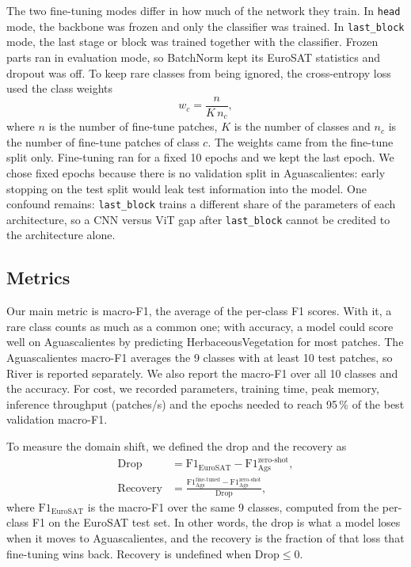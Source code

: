 The two fine-tuning modes differ in how much of the network they train. In \texttt{head} mode,
the backbone was frozen and only the classifier was trained. In \texttt{last\_block} mode, the
last stage or block was trained together with the classifier. Frozen parts ran in evaluation
mode, so BatchNorm kept its EuroSAT statistics and dropout was off. To keep rare classes from
being ignored, the cross-entropy loss used the class weights
\begin{equation}
  w_c = \frac{n}{K\, n_c},
  \label{eq:class_weights}
\end{equation}
where $n$ is the number of fine-tune patches, $K$ is the number of classes and $n_c$ is the
number of fine-tune patches of class $c$. The weights came from the fine-tune split only.
Fine-tuning ran for a fixed 10 epochs and we kept the last epoch. We chose fixed epochs
because there is no validation split in Aguascalientes: early stopping on the test split would
leak test information into the model. One confound remains: \texttt{last\_block} trains a
different share of the parameters of each architecture, so a CNN versus ViT gap after
\texttt{last\_block} cannot be credited to the architecture alone.

\subsection{Metrics}

Our main metric is macro-F1, the average of the per-class F1 scores. With it, a rare class
counts as much as a common one; with accuracy, a model could score well on Aguascalientes by
predicting HerbaceousVegetation for most patches. The Aguascalientes macro-F1 averages the 9
classes with at least 10 test patches, so River is reported separately. We also report the
macro-F1 over all 10 classes and the accuracy. For cost, we recorded parameters, training time,
peak memory, inference throughput (patches/s) and the epochs needed to reach 95\,\% of the best
validation macro-F1.

To measure the domain shift, we defined the drop and the recovery as
\begin{align}
  \mathrm{Drop} &= \mathrm{F1}_{\mathrm{EuroSAT}} - \mathrm{F1}_{\mathrm{Ags}}^{\text{zero-shot}},
  \label{eq:drop}\\
  \mathrm{Recovery} &= \frac{\mathrm{F1}_{\mathrm{Ags}}^{\text{fine-tuned}}
    - \mathrm{F1}_{\mathrm{Ags}}^{\text{zero-shot}}}{\mathrm{Drop}},
  \label{eq:recovery}
\end{align}
where $\mathrm{F1}_{\mathrm{EuroSAT}}$ is the macro-F1 over the same 9 classes, computed from
the per-class F1 on the EuroSAT test set. In other words, the drop is what a model loses when
it moves to Aguascalientes, and the recovery is the fraction of that loss that fine-tuning wins
back. Recovery is undefined when $\mathrm{Drop} \le 0$.

